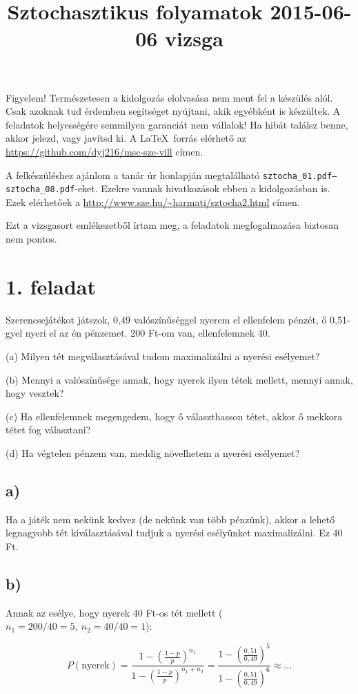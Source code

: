 \documentclass[a4paper,12pt]{article}
\title{Sztochasztikus folyamatok 2015-06-06 vizsga}
\begin{document}
\maketitle

Figyelem! Természetesen a kidolgozás elolvasása nem ment fel a készülés
alól. Csak azoknak tud érdemben segítséget nyújtani, akik egyébként is
készültek. A feladatok helyességére semmilyen garanciát nem vállalok!
Ha hibát találsz benne, akkor jelezd, vagy javítsd ki. A \LaTeX\ forrás
elérhető az \url{https://github.com/dyj216/msc-sze-vill} címen.

A felkészüléshez ajánlom a tanár úr honlapján megtalálható 
\texttt{\mbox{sztocha\_01.pdf}--\mbox{sztocha\_08.pdf}}-eket. Ezekre vannak hivatkozások 
ebben a kidolgozásban is. Ezek elérhetőek a 
\url{http://www.sze.hu/~harmati/sztocha2.html} címen.

Ezt a vizsgasort emlékezetből írtam meg, a feladatok megfogalmazása
biztosan nem pontos.

\section*{1. feladat}
Szerencsejátékot játszok, 0,49 valószínűséggel nyerem el ellenfelem 
pénzét, ő 0,51-gyel nyeri el az én pénzemet. 200 Ft-om van,
ellenfelemnek 40.

(a) Milyen tét megválasztásával tudom maximalizálni a nyerési 
esélyemet?

(b) Mennyi a valószínűsége annak, hogy nyerek ilyen tétek mellett, 
mennyi annak, hogy vesztek?

(c) Ha ellenfelemnek megengedem, hogy ő választhasson tétet, 
akkor ő mekkora tétet fog választani?

(d) Ha végtelen pénzem van, meddig növelhetem a nyerési esélyemet?

\subsection*{a)}
Ha a játék nem nekünk kedvez (de nekünk van több pénzünk), akkor
a lehető legnagyobb tét kiválasztásával tudjuk a nyerési esélyünket
maximalizálni. Ez 40 Ft.

\subsection*{b)}
Annak az esélye, hogy nyerek 40 Ft-os tét mellett 
($n_1 = 200/40 = 5, \ n_2 = 40/40 = 1$):

\[
P(\textrm{nyerek}) = 
\frac{1 - \left( \frac{1-p}{p} \right)^{n_1}}
{1 - \left( \frac{1-p}{p} \right)^{n_1 + n_2}} = 
\frac{1 - \left( \frac{0,51}{0,49} \right)^{5}}
{1 - \left( \frac{0,51}{0,49} \right)^{6}} \approx ...
\]
\end{document}
